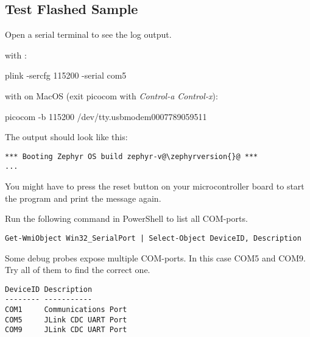 \subsection{Test Flashed Sample}

Open a serial terminal to see the log output.

with :

\begin{monobox}
plink -sercfg 115200 -serial com5
\end{monobox}

with  on MacOS (exit picocom with \emph{Control-a Control-x}):

\begin{monobox}
picocom -b 115200 /dev/tty.usbmodem0007789059511
\end{monobox}

The output should look like this:

\begin{lstlisting}
*** Booting Zephyr OS build zephyr-v@\zephyrversion{}@ ***
...
\end{lstlisting}

You might have to press the reset button on your microcontroller board to start the program and print the message again.

\begin{infobox}
  Run the following command in PowerShell to list all COM-ports.
\begin{lstlisting}
Get-WmiObject Win32_SerialPort | Select-Object DeviceID, Description
\end{lstlisting}

  Some debug probes expose multiple COM-ports.
  In this case COM5 and COM9.
  Try all of them to find the correct one.

\begin{lstlisting}
DeviceID Description
-------- -----------
COM1     Communications Port
COM5     JLink CDC UART Port
COM9     JLink CDC UART Port
\end{lstlisting}
\end{infobox}
